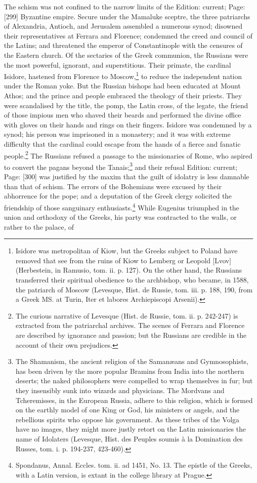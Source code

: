 The schism was not confined to the narrow limits of the Edition: current; Page: [299] Byzantine empire. Secure under the Mamaluke sceptre, the three patriarchs of Alexandria, Antioch, and Jerusalem assembled a numerous synod; disowned their representatives at Ferrara and Florence; condemned the creed and council of the Latins; and threatened the emperor of Constantinople with the censures of the Eastern church. Of the sectaries of the Greek communion, the Russians were the most powerful, ignorant, and superstitious. Their primate, the cardinal Isidore, hastened from Florence to Moscow,\footnote{Isidore was metropolitan of Kiow, but the Greeks subject to Poland have removed that see from the ruins of Kiow to Lemberg or Leopold [Lvov] (Herbestein, in Ramusio, tom. ii. p. 127). On the other hand, the Russians transferred their spiritual obedience to the archbishop, who became, in 1588, the patriarch of Moscow (Levesque, Hist. de Russie, tom. iii. p. 188, 190, from a Greek MS. at Turin, Iter et labores Archiepiscopi Arsenii).} to reduce the independent nation under the Roman yoke. But the Russian bishops had been educated at Mount Athos; and the prince and people embraced the theology of their priests. They were scandalised by the title, the pomp, the Latin cross, of the legate, the friend of those impious men who shaved their beards and performed the divine office with gloves on their hands and rings on their fingers. Isidore was condemned by a synod; his person was imprisoned in a monastery; and it was with extreme difficulty that the cardinal could escape from the hands of a fierce and fanatic people.\footnote{The curious narrative of Levesque (Hist. de Russie, tom. ii. p. 242-247) is extracted from the patriarchal archives. The scenes of Ferrara and Florence are described by ignorance and passion; but the Russians are credible in the account of their own prejudices.} The Russians refused a passage to the missionaries of Rome, who aspired to convert the pagans beyond the Tanais;\footnote{The Shamanism, the ancient religion of the Samanæans and Gymnosophists, has been driven by the more popular Bramins from India into the northern deserts; the naked philosophers were compelled to wrap themselves in fur; but they insensibly sunk into wizards and physicians. The Mordvans and Tcheremisses, in the European Russia, adhere to this religion, which is formed on the earthly model of one King or God, his ministers or angels, and the rebellious spirits who oppose his government. As these tribes of the Volga have no images, they might more justly retort on the Latin missionaries the name of Idolaters (Levesque, Hist. des Peuples soumis à la Domination des Russes, tom. i. p. 194-237, 423-460).} and their refusal Edition: current; Page: [300] was justified by the maxim that the guilt of idolatry is less damnable than that of schism. The errors of the Bohemians were excused by their abhorrence for the pope; and a deputation of the Greek clergy solicited the friendship of those sanguinary enthusiasts.\footnote{Spondanus, Annal. Eccles. tom. ii. ad 1451, No. 13. The epistle of the Greeks, with a Latin version, is extant in the college library at Prague.} While Eugenius triumphed in the union and orthodoxy of the Greeks, his party was contracted to the walls, or rather to the palace, of 